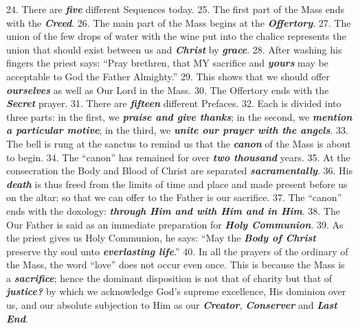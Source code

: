 \documentclass[a4paper,14pt]{memoir}
\newcommand\answer[1]{\textbf{\textit{#1}}}
\begin{document}
24. There are  \answer{five}  different
Sequences today. 
25. The first part of the Mass ends with the \answer{Creed}.  
26.
The main part of the Mass begins at the \answer{Offertory}. 
27. The union of  the  few
drops of water with the wine put into the chalice represents the union  that
should exist between us and \answer{Christ} by  \answer{grace}.  
28.  After  washing  his
fingers the priest says: “Pray brethren, that MY sacrifice and \answer{yours}  may
be acceptable to God the Father Almighty.” 
29. This  shows  that  we  should
offer \answer{ourselves} as well as Our Lord in the Mass. 
30. The Offertory ends  with
the \answer{Secret} prayer. 
31. There are \answer{fifteen} different Prefaces. 
32. Each  is
divided into three parts: in the first,  we  \answer{praise and give thanks};  in  the  second,  we
\answer{mention a particular motive}; in the third, we \answer{unite our prayer with the angels}. 
33. The bell is rung at the sanctus  to
remind us that the \answer{canon} of the Mass is about to begin. 
34.  The  “canon”
has remained for over \answer{two thousand} years. 
35. At the consecration the  Body  and
Blood of Christ are separated \answer{sacramentally}. 
36. His \answer{death} is thus freed  from
the limits of time and place and made present before us  on  the  altar;  so
that we can offer to the Father is our sacrifice. 
37. The “canon” ends  with
the doxology:  \answer{through Him and with Him and in Him}.  
38.  The  Our  Father  is  said  as  an  immediate
preparation for \answer{Holy Communion}. 
39. As the priest  gives  us  Holy  Communion,  he
says: “May the \answer{Body of Christ} preserve thy soul unto \answer{everlasting life}.”  
40.  In  all  the
prayers of the ordinary of the Mass, the word “love”  does  not  occur  even
once.  This  is  because  the  Mass  is  a  \answer{sacrifice};  hence  the   dominant
disposition is not that  of  charity  but  that  of  \answer{justice?}  by  which  we
acknowledge  God's  supreme  excellence,  His  dominion  over  us,  and  our
absolute subjection to Him as our \answer{Creator}, \answer{Conserver} and \answer{Last End}.
\end{document}
